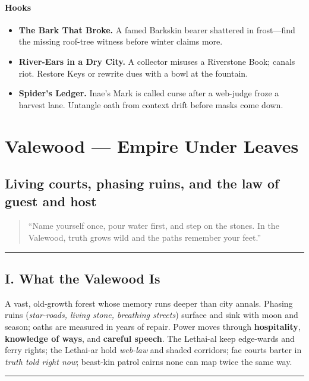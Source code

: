 \documentclass[11pt]{article}
\begin{document}
\paragraph{Hooks}
\begin{itemize}[leftmargin=*]
  \item \textbf{The Bark That Broke.} A famed Barkskin bearer shattered in frost---find the missing roof-tree witness before winter claims more.
  \item \textbf{River-Ears in a Dry City.} A collector misuses a Riverstone Book; canals riot. Restore Keys or rewrite dues with a bowl at the fountain.
  \item \textbf{Spider's Ledger.} Inae's Mark is called curse after a web-judge froze a harvest lane. Untangle oath from context drift before masks come down.
\end{itemize}

\section{Valewood --- Empire Under Leaves}

\subsection*{Living courts, phasing ruins, and the law of guest and host}

\begin{quote}
``Name yourself once, pour water first, and step on the stones. In the Valewood, truth grows wild and the paths remember your feet.''
\end{quote}

\medskip\hrule\medskip

\subsection{I. What the Valewood Is}
A vast, old-growth forest whose memory runs deeper than city annals. Phasing ruins (\emph{star-roads, living stone, breathing streets}) surface and sink with moon and season; oaths are measured in years of repair. Power moves through \textbf{hospitality}, \textbf{knowledge of ways}, and \textbf{careful speech}. The Lethai-al keep edge-wards and ferry rights; the Lethai-ar hold \emph{web-law} and shaded corridors; fae courts barter in \emph{truth told right now}; beast-kin patrol cairns none can map twice the same way.

\medskip\hrule\medskip
\end{document}
